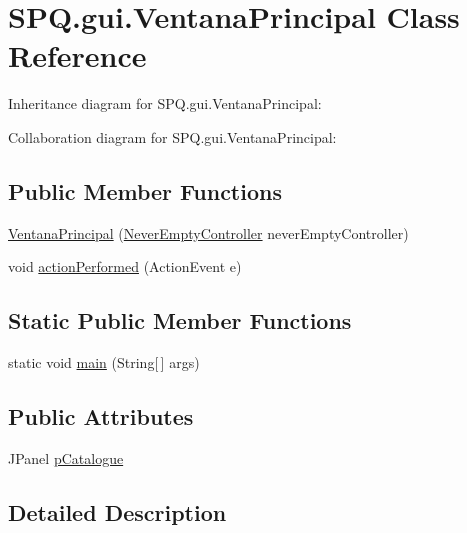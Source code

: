 \hypertarget{class_s_p_q_1_1gui_1_1_ventana_principal}{}\section{S\+P\+Q.\+gui.\+Ventana\+Principal Class Reference}
\label{class_s_p_q_1_1gui_1_1_ventana_principal}


Inheritance diagram for S\+P\+Q.\+gui.\+Ventana\+Principal\+:


Collaboration diagram for S\+P\+Q.\+gui.\+Ventana\+Principal\+:
\subsection*{Public Member Functions}
\begin{DoxyCompactItemize}
\item 
\mbox{\hyperlink{class_s_p_q_1_1gui_1_1_ventana_principal_ab35bb8c8e3a0b03050093cc3d6b58a90}{Ventana\+Principal}} (\mbox{\hyperlink{class_s_p_q_1_1controller_1_1_never_empty_controller}{Never\+Empty\+Controller}} never\+Empty\+Controller)
\item 
void \mbox{\hyperlink{class_s_p_q_1_1gui_1_1_ventana_principal_a8cb181f9dff7128cd674383688ca2c56}{action\+Performed}} (Action\+Event e)
\end{DoxyCompactItemize}
\subsection*{Static Public Member Functions}
\begin{DoxyCompactItemize}
\item 
static void \mbox{\hyperlink{class_s_p_q_1_1gui_1_1_ventana_principal_a48fb869f7efb018079dac708ed20f7d3}{main}} (String\mbox{[}$\,$\mbox{]} args)
\end{DoxyCompactItemize}
\subsection*{Public Attributes}
\begin{DoxyCompactItemize}
\item 
J\+Panel \mbox{\hyperlink{class_s_p_q_1_1gui_1_1_ventana_principal_a0835e35fdf5ad82ba10366336f5fbdb4}{p\+Catalogue}}
\end{DoxyCompactItemize}


\subsection{Detailed Description}


